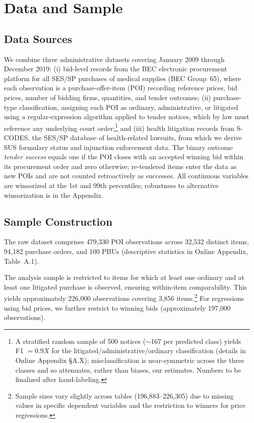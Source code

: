 \section{Data and Sample}
\label{sec:data}

\subsection{Data Sources}

We combine three administrative datasets covering January 2009 through December 2019: (i) bid-level records from the BEC electronic procurement platform for all SES/SP purchases of medical supplies (BEC Group~65), where each observation is a purchase-offer-item (POI) recording reference prices, bid prices, number of bidding firms, quantities, and tender outcomes; (ii) purchase-type classification, assigning each POI as ordinary, administrative, or litigated using a regular-expression algorithm applied to tender notices, which by law must reference any underlying court order;\footnote{A stratified random sample of 500 notices (\(\sim\)167 per predicted class) yields F1 $= 0.9X$ for the litigated/administrative/ordinary classification (details in Online Appendix \S A.X); misclassification is near-symmetric across the three classes and so attenuates, rather than biases, our estimates. Numbers to be finalized after hand-labeling.} and (iii) health litigation records from S-CODES, the SES/SP database of health-related lawsuits, from which we derive SUS formulary status and injunction enforcement data. The binary outcome \emph{tender success} equals one if the POI closes with an accepted winning bid within its procurement order and zero otherwise; re-tendered items enter the data as new POIs and are not counted retroactively as successes. All continuous variables are winsorized at the 1st and 99th percentiles; robustness to alternative winsorization is in the Appendix.

\subsection{Sample Construction}

The raw dataset comprises 479,330 POI observations across 32,532 distinct items, 94,182 purchase orders, and 100 PBUs (descriptive statistics in Online Appendix, Table~A.1).

The analysis sample is restricted to items for which at least one ordinary and at least one litigated purchase is observed, ensuring within-item comparability. This yields approximately 226,000 observations covering 3,856 items.\footnote{Sample sizes vary slightly across tables (196,883--226,305) due to missing values in specific dependent variables and the restriction to winners for price regressions.} For regressions using bid prices, we further restrict to winning bids (approximately 197,000 observations).

